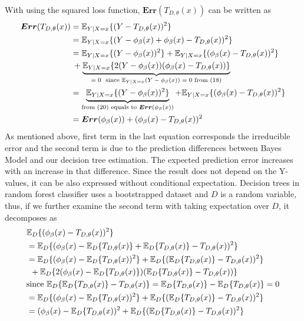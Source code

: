 \paragraph{}
With using the squared loss function, $\boldsymbol{Err}(T_{D,\theta}(x))$ can be written as
\begin{align}
\boldsymbol{Err}(T_{D, \theta}(x)) & = \mathbb{E}_{Y|X=x}\{(Y-T_{D,\theta}(x))^2\} \notag \\
							  & = \mathbb{E}_{Y|X=x}\{(Y -\phi_{\beta}(x) +\phi_{\beta}(x) -T_{D,\theta}(x))^2\} \notag \\
							  & = \mathbb{E}_{Y|X=x}\{(Y-\phi_{\beta}(x))^2\} + \mathbb{E}_{Y|X=x}\{(\phi_{\beta}(x)-T_{D,\theta}(x))^2\} \notag \\
							  &	\: + \underbrace{\mathbb{E}_{Y|X=x}\{2(Y-\phi_{\beta}(x))(\phi_{\beta}(x)-T_{D,\theta}(x))\}}_\text{$=0$ \ since $ \mathbb{E}_{Y|X=x}(Y-\phi_{\beta}(x)) = 0$ from $(18)$}  \notag \\
							  & = \underbrace{\mathbb{E}_{Y|X=x}\{(Y-\phi_{\beta}(x))^2\}}_\text{from $(20)$ equals to $\boldsymbol{Err}(\phi_{\beta}(x))$} + \mathbb{E}_{Y|X=x}\{(\phi_{\beta}(x)-T_{D,\theta}(x))^2\}  \notag \\
							  & = \boldsymbol{Err}(\phi_{\beta}(x)) + (\phi_{\beta}(x)-T_{D,\theta}(x))^2
\end{align}
As mentioned above, first term in the last equation corresponds the irreducible error and the second term is due to the prediction differences between Bayes Model and our decision tree estimation. The expected prediction error increases with an increase in that difference. Since the result does not depend on the Y-values, it can be also expressed without conditional expectation. Decision trees in random forest classifier uses a bootstrapped dataset and $D$ is a random variable, thus, if we further examine the second term with taking expectation over $D$, it decomposes as
\begin{align}
& \mathbb{E}_{D}\{(\phi_{\beta}(x) - T_{D,\theta}(x))^2 \} \notag \\
& = \mathbb{E}_{D}\{(\phi_{\beta}(x) - \mathbb{E}_{D}\{T_{D,\theta}(x)\} + \mathbb{E}_{D}\{T_{D,\theta}(x)\} - T_{D,\theta}(x))^2\} \notag \\
& = \mathbb{E}_{D}\{(\phi_{\beta}(x) - \mathbb{E}_{D}\{T_{D,\theta}(x))^2\} 
	+ \mathbb{E}_{D}\{(\mathbb{E}_{D}\{T_{D,\theta}(x)\} - T_{D,\theta}(x))^2\} \notag \\
&\: \: + \mathbb{E}_{D}\{2(\phi_{\beta}(x) - \mathbb{E}_{D}\{T_{D,\theta}(x)\})(\mathbb{E}_{D}\{T_{D,\theta}(x)\} - T_{D,\theta}(x))\} \notag \\
& \text{since $\mathbb{E}_{D}\{\mathbb{E}_{D}\{T_{D,\theta}(x)\} - T_{D,\theta}(x)\} = \mathbb{E}_{D}\{T_{D,\theta}(x)\} - \mathbb{E}_{D}\{T_{D,\theta}(x)\} = 0$} \notag \\
& = \mathbb{E}_{D}\{(\phi_{\beta}(x) - \mathbb{E}_{D}\{T_{D,\theta}(x))^2\} 
	+ \mathbb{E}_{D}\{(\mathbb{E}_{D}\{T_{D,\theta}(x)\} - T_{D,\theta}(x))^2\} \notag \\
& = (\phi_{\beta}(x) - \mathbb{E}_{D}\{T_{D,\theta}(x))^2 + \mathbb{E}_{D}\{(\mathbb{E}_{D}\{T_{D,\theta}(x)\} - T_{D,\theta}(x))^2\}
\end{align}
